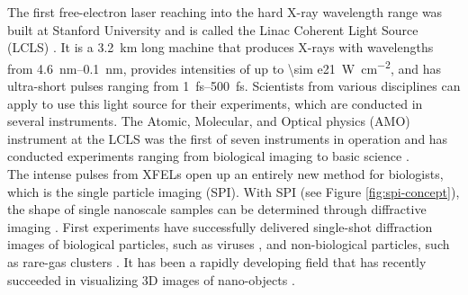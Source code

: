 %
The first free-electron laser reaching into the hard X-ray wavelength range was built at Stanford University and is called the Linac Coherent Light Source (LCLS) \citep{Emma-2010-NatPho}. It is a \SI{3.2}{\kilo\meter} long machine that produces X-rays with wavelengths from \SIrange{4.6}{0.1}{\nano\meter}, provides intensities of up to \SI{\sim e21}{\watt\per\square\centi\meter}, and has ultra-short pulses ranging from \SIrange{1}{500}{\femto\second}. Scientists from various disciplines can apply to use this light source for their experiments, which are conducted in several instruments. The Atomic, Molecular, and Optical physics (AMO) instrument \cite{Ferguson-2015-JSR} at the LCLS was the first of seven instruments in operation and has conducted experiments ranging from biological imaging to basic science \citep{Bostedt-2016-RMP}.\\[1\baselineskip]
%
The intense pulses from XFELs open up an entirely new method for biologists, which is the single particle imaging (SPI). With SPI (see Figure \ref{fig:spi-concept}), the shape of single nanoscale samples can be determined through diffractive imaging \citep{Chapman-2006-NatPhys}. First experiments have successfully delivered single-shot diffraction images of biological particles, such as viruses \citep{Seibert-2011-Nature}, and non-biological particles, such as rare-gas clusters \citep{Gomez-2014-Science}. It has been a rapidly developing field that has recently succeeded in visualizing 3D images of nano-objects \citep{Ekeberg-2015-PRL,Barke-2015-NatComm}.\\[1\baselineskip]
%
%
